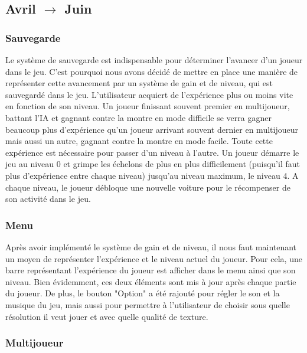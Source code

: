 \documentclass[a4paper,12pt]{article}
\begin{document}
        \subsection{Avril $\to$ Juin}
            \subsubsection{Sauvegarde}
               Le système de sauvegarde est indispensable pour déterminer l'avancer d'un joueur dans le jeu. C'est 
               pourquoi nous avons décidé de mettre en place une manière de représenter cette avancement par un système 
               de gain et de niveau, qui est sauvegardé dans le jeu. L'utilisateur acquiert de l'expérience plus ou 
               moins vite en fonction de son niveau. Un joueur finissant souvent premier en multijoueur, battant l'IA et
               gagnant contre la montre en mode difficile se verra gagner beaucoup plus d'expérience qu'un joueur 
               arrivant souvent dernier en multijoueur mais aussi un autre, gagnant contre la montre en mode facile. 
               Toute cette expérience est nécessaire pour passer d'un niveau à l'autre. Un joueur démarre le jeu au 
               niveau 0 et grimpe les échelons de plus en plus difficilement (puisqu'il faut plus d'expérience entre 
               chaque niveau) jusqu'au niveau maximum, le niveau 4. A chaque niveau, le joueur débloque une nouvelle 
               voiture pour le récompenser de son activité dans le jeu.
               
            \subsubsection{Menu}
                Après avoir implémenté le système de gain et de niveau, il nous faut maintenant un moyen de représenter
                l'expérience et le niveau actuel du joueur. Pour cela, une barre représentant l'expérience du joueur est
                afficher dans le menu ainsi que son niveau. Bien évidemment, ces deux éléments sont mis à jour après 
                chaque partie du joueur. De plus, le bouton "Option" a été rajouté pour régler le son et la musique du 
                jeu, mais aussi pour permettre à l'utilisateur de choisir sous quelle résolution il veut jouer et avec 
                quelle qualité de texture.  
                
            \subsubsection{Multijoueur}
            \lipsum[33]
            
\end{document}
